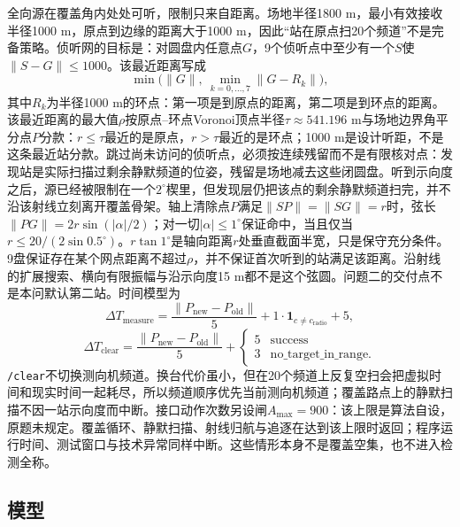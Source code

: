 \documentclass{cumcmthesis}
\begin{document}
全向源在覆盖角内处处可听，限制只来自距离。场地半径1800 m，最小有效接收半径1000 m，原点到边缘的距离大于1000 m，因此“站在原点扫20个频道”不是完备策略。侦听网的目标是：对圆盘内任意点$G$，9个侦听点中至少有一个$S$使$\|S-G\|\le 1000$。该最近距离写成
\[
\min\bigl(\|G\|,\ \min_{k=0,\ldots,7}\|G-R_k\|\bigr),
\]
其中$R_k$为半径1000 m的环点：第一项是到原点的距离，第二项是到环点的距离。该最近距离的最大值$\rho$按原点--环点Voronoi顶点半径$\tau\approx 541.196$ m与场地边界角平分点$P$分款：$r\le\tau$最近的是原点，$r>\tau$最近的是环点；1000 m是设计听距，不是这条最近站分款。跳过尚未访问的侦听点，必须按连续残留而不是有限核对点：发现站是实际扫描过剩余静默频道的位姿，残留是场地减去这些闭圆盘。听到示向度之后，源已经被限制在一个$2^\circ$楔里，但发现层仍把该点的剩余静默频道扫完，并不沿该射线立刻离开覆盖骨架。轴上清除点$P$满足$\|SP\|=\|SG\|=r$时，弦长$\|PG\|=2r\sin(|\alpha|/2)$；对一切$|\alpha|\le 1^\circ$保证命中，当且仅当$r\le 20/(2\sin 0.5^\circ)$。$r\tan 1^\circ$是轴向距离$r$处垂直截面半宽，只是保守充分条件。9盘保证存在某个网点距离不超过$\rho$，并不保证首次听到的站满足该距离。沿射线的扩展搜索、横向有限振幅与沿示向度15 m都不是这个弦圆。问题二的交付点不是本问默认第二站。时间模型为
\begin{equation}
\Delta T_{\mathrm{measure}}=\frac{\|P_{\mathrm{new}}-P_{\mathrm{old}}\|}{5}+1\cdot\mathbf{1}_{c\neq c_{\mathrm{radio}}}+5,
\label{eq:tmeas}
\end{equation}
\begin{equation}
\Delta T_{\mathrm{clear}}=\frac{\|P_{\mathrm{new}}-P_{\mathrm{old}}\|}{5}+\begin{cases}5 & \text{success}\\ 3 & \text{no\_target\_in\_range.}\end{cases}
\label{eq:tclr}
\end{equation}
\texttt{/clear}不切换测向机频道。换台代价虽小，但在20个频道上反复空扫会把虚拟时间和现实时间一起耗尽，所以频道顺序优先当前测向机频道；覆盖路点上的静默扫描不因一站示向度而中断。接口动作次数另设闸$A_{\max}=900$：该上限是算法自设，原题未规定。覆盖循环、静默扫描、射线归航与追逐在达到该上限时返回；程序运行时间、测试窗口与技术异常同样中断。这些情形本身不是覆盖空集，也不进入检测全称。

\subsection{模型}
\end{document}
